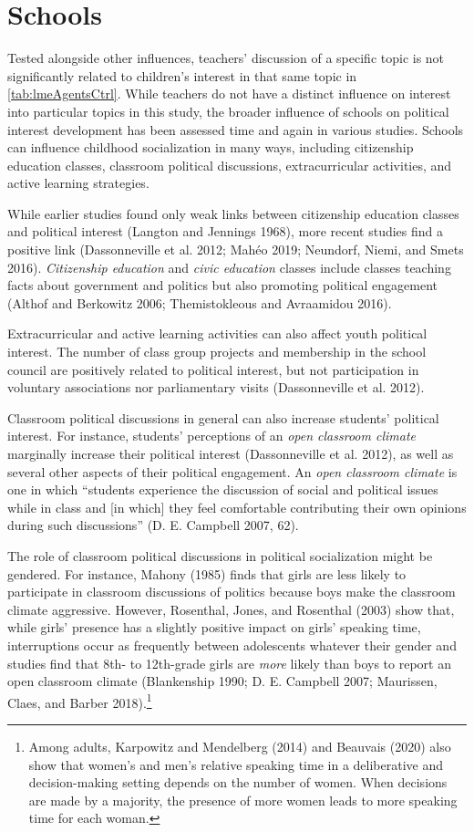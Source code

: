 \documentclass[
  letterpaper,
  DIV=11,
  numbers=noendperiod]{scrreprt}
\begin{document}
\section{Schools}\label{schools}

Tested alongside other influences, teachers' discussion of a specific
topic is not significantly related to children's interest in that same
topic in \ref{tab:lmeAgentsCtrl}. While teachers do not have a distinct
influence on interest into particular topics in this study, the broader
influence of schools on political interest development has been assessed
time and again in various studies. Schools can influence childhood
socialization in many ways, including citizenship education classes,
classroom political discussions, extracurricular activities, and active
learning strategies.

While earlier studies found only weak links between citizenship
education classes and political interest (Langton and Jennings 1968),
more recent studies find a positive link (Dassonneville et al. 2012;
Mahéo 2019; Neundorf, Niemi, and Smets 2016). \emph{Citizenship
education} and \emph{civic education} classes include classes teaching
facts about government and politics but also promoting political
engagement (Althof and Berkowitz 2006; Themistokleous and Avraamidou
2016).

Extracurricular and active learning activities can also affect youth
political interest. The number of class group projects and membership in
the school council are positively related to political interest, but not
participation in voluntary associations nor parliamentary visits
(Dassonneville et al. 2012).

Classroom political discussions in general can also increase students'
political interest. For instance, students' perceptions of an \emph{open
classroom climate} marginally increase their political interest
(Dassonneville et al. 2012), as well as several other aspects of their
political engagement. An \emph{open classroom climate} is one in which
``students experience the discussion of social and political issues
while in class and {[}in which{]} they feel comfortable contributing
their own opinions during such discussions'' (D. E. Campbell 2007, 62).

The role of classroom political discussions in political socialization
might be gendered. For instance, Mahony (1985) finds that girls are less
likely to participate in classroom discussions of politics because boys
make the classroom climate aggressive. However, Rosenthal, Jones, and
Rosenthal (2003) show that, while girls' presence has a slightly
positive impact on girls' speaking time, interruptions occur as
frequently between adolescents whatever their gender and studies find
that 8th- to 12th-grade girls are \emph{more} likely than boys to report
an open classroom climate (Blankenship 1990; D. E. Campbell 2007;
Maurissen, Claes, and Barber 2018).\footnote{Among adults, Karpowitz and
  Mendelberg (2014) and Beauvais (2020) also show that women's and men's
  relative speaking time in a deliberative and decision-making setting
  depends on the number of women. When decisions are made by a majority,
  the presence of more women leads to more speaking time for each woman.}
\end{document}
